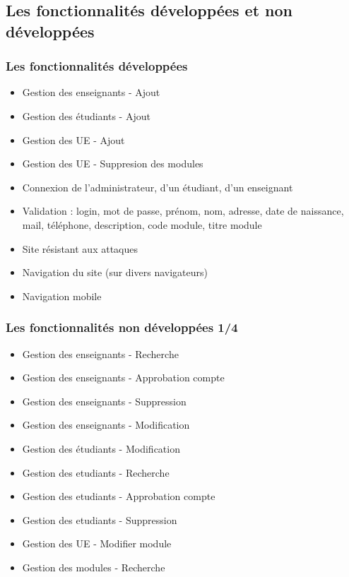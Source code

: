 \documentclass{beamer}
\begin{document}
    \subsection{Les fonctionnalités développées et non développées}
    \begin{frame}
      \frametitle{Les fonctionnalités développées}
      \begin{block}{}
        \begin{itemize}
          \item Gestion des enseignants - Ajout
          \item Gestion des étudiants - Ajout
          \item Gestion des UE - Ajout
          \item Gestion des UE - Suppresion des modules
          \item Connexion de l'administrateur, d'un étudiant, d'un enseignant
          \item Validation : login, mot de passe, prénom, nom, adresse, date de naissance, mail, téléphone, description, code module, titre module
          \item Site résistant aux attaques
          \item Navigation du site (sur divers navigateurs)
          \item Navigation mobile
        \end{itemize}
      \end{block}
    \end{frame}
    \begin{frame}
      \frametitle{Les fonctionnalités non développées 1/4}
      \begin{block}{}
        \begin{itemize}
          \item Gestion des enseignants - Recherche
          \item Gestion des enseignants - Approbation compte
          \item Gestion des enseignants - Suppression
          \item Gestion des enseignants - Modification
          \item Gestion des étudiants - Modification
          \item Gestion des etudiants - Recherche
          \item Gestion des etudiants - Approbation compte
          \item Gestion des etudiants - Suppression
          \item Gestion des UE - Modifier module
          \item Gestion des modules - Recherche
        \end{itemize}
      \end{block}
    \end{frame}
\end{document}
